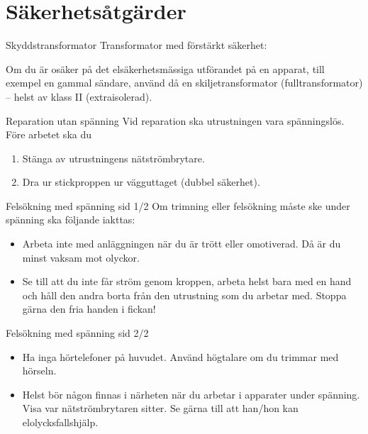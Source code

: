 \documentclass{beamer}
\begin{document}
\section{Säkerhetsåtgärder}
\begin{frame}{Skyddstransformator}
Transformator med förstärkt säkerhet:

\begin{center}
	\begin{minipage}{0.19\columnwidth}
		\Huge{\selectfont{}\relax}
	\end{minipage}
	\begin{minipage}{0.7\columnwidth}
		Om du är osäker på det elsäkerhetsmässiga utförandet på en
		apparat, till exempel en gammal sändare, använd då en skiljetransformator
		(fulltransformator) -- helst av klass II (extraisolerad).
	\end{minipage}
\end{center}
\end{frame}

\begin{frame}{Reparation utan spänning}
Vid reparation ska utrustningen vara spänningslös.
Före arbetet ska du

\begin{enumerate}
	\item Stänga av utrustningens nätströmbrytare.
	\item Dra ur stickproppen ur vägguttaget (dubbel säkerhet).
\end{enumerate}
\end{frame}

\begin{frame}{Felsökning med spänning sid 1/2}
Om trimning eller felsökning måste ske under spänning ska följande iakttas:
\begin{itemize}
	\item Arbeta inte med anläggningen när du är trött eller omotiverad.
	Då är du minst vaksam mot olyckor.
	\item Se till att du inte får ström genom kroppen, arbeta helst bara med en
	hand och håll den andra borta från den utrustning som du arbetar med.
	Stoppa gärna den fria handen i fickan!
\end{itemize}
\end{frame}

\begin{frame}{Felsökning med spänning sid 2/2}
\begin{itemize}
	\item Ha inga hörtelefoner på huvudet.
	Använd högtalare om du trimmar med hörseln.
	\item Helst bör någon finnas i närheten när du arbetar i apparater under
	spänning.
	Visa var nätströmbrytaren sitter.
	Se gärna till att han/hon kan elolycksfallshjälp.
\end{itemize}
\end{frame}
\end{document}
